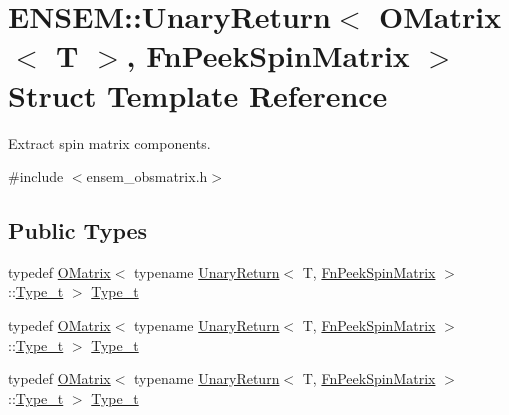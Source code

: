\hypertarget{structENSEM_1_1UnaryReturn_3_01OMatrix_3_01T_01_4_00_01FnPeekSpinMatrix_01_4}{}\section{E\+N\+S\+EM\+:\+:Unary\+Return$<$ O\+Matrix$<$ T $>$, Fn\+Peek\+Spin\+Matrix $>$ Struct Template Reference}
\label{structENSEM_1_1UnaryReturn_3_01OMatrix_3_01T_01_4_00_01FnPeekSpinMatrix_01_4}


Extract spin matrix components.  




{\ttfamily \#include $<$ensem\+\_\+obsmatrix.\+h$>$}

\subsection*{Public Types}
\begin{DoxyCompactItemize}
\item 
typedef \mbox{\hyperlink{classENSEM_1_1OMatrix}{O\+Matrix}}$<$ typename \mbox{\hyperlink{structENSEM_1_1UnaryReturn}{Unary\+Return}}$<$ T, \mbox{\hyperlink{structENSEM_1_1FnPeekSpinMatrix}{Fn\+Peek\+Spin\+Matrix}} $>$\+::\mbox{\hyperlink{structENSEM_1_1UnaryReturn_3_01OMatrix_3_01T_01_4_00_01FnPeekSpinMatrix_01_4_a9a23ee99cd498ef33180f667eae28655}{Type\+\_\+t}} $>$ \mbox{\hyperlink{structENSEM_1_1UnaryReturn_3_01OMatrix_3_01T_01_4_00_01FnPeekSpinMatrix_01_4_a9a23ee99cd498ef33180f667eae28655}{Type\+\_\+t}}
\item 
typedef \mbox{\hyperlink{classENSEM_1_1OMatrix}{O\+Matrix}}$<$ typename \mbox{\hyperlink{structENSEM_1_1UnaryReturn}{Unary\+Return}}$<$ T, \mbox{\hyperlink{structENSEM_1_1FnPeekSpinMatrix}{Fn\+Peek\+Spin\+Matrix}} $>$\+::\mbox{\hyperlink{structENSEM_1_1UnaryReturn_3_01OMatrix_3_01T_01_4_00_01FnPeekSpinMatrix_01_4_a9a23ee99cd498ef33180f667eae28655}{Type\+\_\+t}} $>$ \mbox{\hyperlink{structENSEM_1_1UnaryReturn_3_01OMatrix_3_01T_01_4_00_01FnPeekSpinMatrix_01_4_a9a23ee99cd498ef33180f667eae28655}{Type\+\_\+t}}
\item 
typedef \mbox{\hyperlink{classENSEM_1_1OMatrix}{O\+Matrix}}$<$ typename \mbox{\hyperlink{structENSEM_1_1UnaryReturn}{Unary\+Return}}$<$ T, \mbox{\hyperlink{structENSEM_1_1FnPeekSpinMatrix}{Fn\+Peek\+Spin\+Matrix}} $>$\+::\mbox{\hyperlink{structENSEM_1_1UnaryReturn_3_01OMatrix_3_01T_01_4_00_01FnPeekSpinMatrix_01_4_a9a23ee99cd498ef33180f667eae28655}{Type\+\_\+t}} $>$ \mbox{\hyperlink{structENSEM_1_1UnaryReturn_3_01OMatrix_3_01T_01_4_00_01FnPeekSpinMatrix_01_4_a9a23ee99cd498ef33180f667eae28655}{Type\+\_\+t}}
\end{DoxyCompactItemize}


